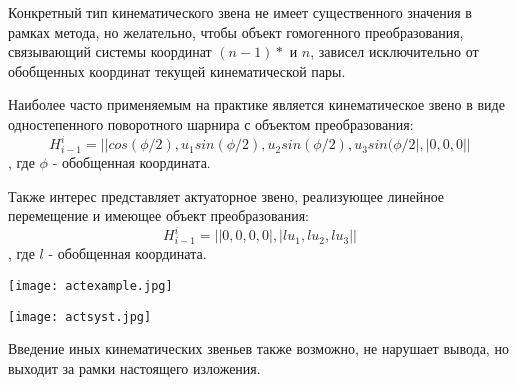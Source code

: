 Конкретный тип кинематического звена не имеет существенного значения в рамках метода, но желательно, чтобы объект гомогенного преобразования, связывающий системы координат $(n-1)*$ и $n$, зависел исключительно от обобщенных координат текущей кинематической пары.

Наиболее часто применяемым на практике является кинематическое звено в виде одностепенного поворотного шарнира с объектом преобразования:
\begin{equation}
H^i_{i-1} = ||cos(\phi/2), u_1sin(\phi/2), u_2sin(\phi/2), u_3sin(\phi/2|, |0, 0, 0||
\end{equation}, где $\phi$ - обобщенная координата.

Также интерес представляет актуаторное звено, реализующее линейное перемещение и имеющее объект преобразования:
\begin{equation}
H^i_{i-1} = ||0, 0, 0, 0|, |lu_1, lu_2, lu_3||
\end{equation}, где $l$ - обобщенная координата.

\begin{center}
  \texttt{[image: actexample.jpg]}
  \label{}
\end{center}

\begin{center}
  \texttt{[image: actsyst.jpg]}
  \label{}
\end{center}

Введение иных кинематических звеньев также возможно, не нарушает вывода, но выходит за рамки настоящего изложения. 